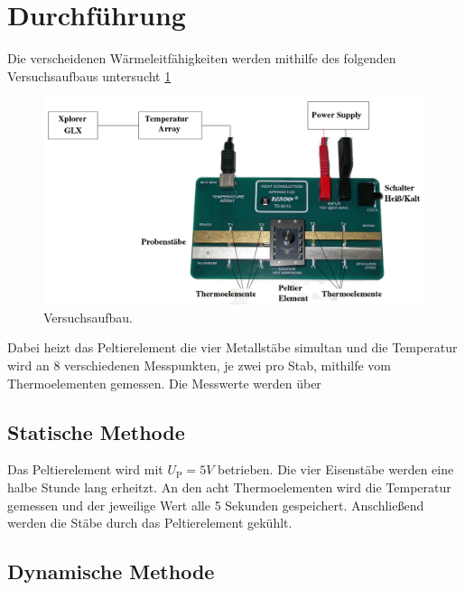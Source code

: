 \section{Durchführung}
\label{sec:Durchführung}
Die verscheidenen Wärmeleitfähigkeiten werden mithilfe des folgenden Versuchsaufbaus
untersucht \ref{fig:aufbau}
\begin{figure}
\centering
\includegraphics[width=\textwidth]{content/aufbau.png}
\caption{Versuchsaufbau.}
\label{fig:aufbau}
\end{figure}
Dabei heizt das Peltierelement die vier Metallstäbe simultan und die Temperatur wird an 8
verschiedenen Messpunkten, je zwei pro Stab, mithilfe vom Thermoelementen gemessen. Die
Messwerte werden über

\subsection{Statische Methode}
\label{sec:statische Methode}
Das Peltierelement wird mit $U_\text{P}=5V$ betrieben.
Die vier Eisenstäbe werden eine halbe Stunde lang erheitzt.
An den acht Thermoelementen wird die Temperatur gemessen und der jeweilige Wert alle 5 Sekunden gespeichert.
Anschließend werden die Stäbe durch das Peltierelement gekühlt.


\subsection{Dynamische Methode}
\label{sec:dynamische Methode}
